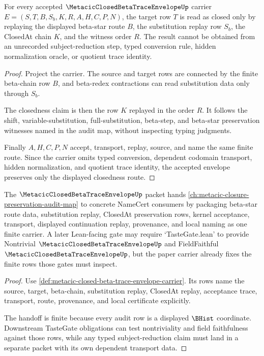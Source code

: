 \begin{theorem}
\label{thm:metacic-closed-beta-trace-envelope-preservation}
For every accepted $\MetacicClosedBetaTraceEnvelopeUp$ carrier $E=(S,T,B,S_b,K,R,A,H,C,P,N)$, the target row $T$ is read as closed only by replaying the displayed beta-star route $B$, the substitution replay row $S_b$, the ClosedAt chain $K$, and the witness order $R$. The result cannot be obtained from an unrecorded subject-reduction step, typed conversion rule, hidden normalization oracle, or quotient trace identity.
\end{theorem}
\begin{proof}
Project the carrier. The source and target rows are connected by the finite beta-chain row $B$, and beta-redex contractions can read substitution data only through $S_b$.

The closedness claim is then the row $K$ replayed in the order $R$. It follows the shift, variable-substitution, full-substitution, beta-step, and beta-star preservation witnesses named in the audit map, without inspecting typing judgments.

Finally $A,H,C,P,N$ accept, transport, replay, source, and name the same finite route. Since the carrier omits typed conversion, dependent codomain transport, hidden normalization, and quotient trace identity, the accepted envelope preserves only the displayed closedness route.
\end{proof}

\begin{theorem}
\label{thm:metacic-closed-beta-trace-envelope-vision-handoff}
The $\MetacicClosedBetaTraceEnvelopeUp$ packet hands \autoref{ch:metacic-closure-preservation-audit-map} to concrete NameCert consumers by packaging beta-star route data, substitution replay, ClosedAt preservation rows, kernel acceptance, transport, displayed continuation replay, provenance, and local naming as one finite carrier. A later Lean-facing gate may require `TasteGate.lean' to provide Nontrivial $\MetacicClosedBetaTraceEnvelopeUp$ and FieldFaithful $\MetacicClosedBetaTraceEnvelopeUp$, but the paper carrier already fixes the finite rows those gates must inspect.
\end{theorem}
\begin{proof}
Use \autoref{def:metacic-closed-beta-trace-envelope-carrier}. Its rows name the source, target, beta-chain, substitution replay, ClosedAt replay, acceptance trace, transport, route, provenance, and local certificate explicitly.

The handoff is finite because every audit row is a displayed $\BHist$ coordinate. Downstream TasteGate obligations can test nontriviality and field faithfulness against those rows, while any typed subject-reduction claim must land in a separate packet with its own dependent transport data.
\end{proof}

